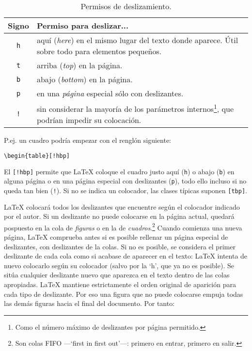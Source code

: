 \begin{table}[!bp]
\caption{Permisos de deslizamiento.}\label{tab:permiss}
\begin{minipage}{\textwidth}
\medskip
\begin{center}
\begin{tabular}{@{}cp{8cm}@{}}
Signo&Permiso para deslizar...\\
\hline
\rule{0pt}{1.05em}\texttt{h} & aquí (\emph{here}) en el mismo lugar
del texto donde aparece.  Útil sobre todo para elementos pequeños.\\[0.3ex]
\texttt{t} & arriba (\emph{top}) en la página.\\[0.3ex]
\texttt{b} & abajo (\emph{bottom}) en la página.\\[0.3ex]
\texttt{p} & en una \emph{página} especial sólo con deslizantes.\\[0.3ex]
\texttt{!} & sin considerar la mayoría de los parámetros
internos\footnote{Como el número máximo de deslizantes por página
  permitido.}, que podrían impedir su colocación.
\end{tabular}
\end{center}
\end{minipage}
\end{table}

P.ej.{} un cuadro podría empezar con el renglón siguiente:
\begin{code}
\verb|\begin{table}[!hbp]|
\end{code}
El  \verb|[!hbp]| permite que \LaTeX{} coloque el cuadro justo aquí (\texttt{h}) o abajo (\texttt{b}) en alguna página o en una página especial con deslizantes (\texttt{p}), todo ello incluso si no queda tan bien (\texttt{!}). Si no se indica un colocador, las clases típicas suponen \verb|[tbp]|.

\LaTeX{} colocará todos los deslizantes que encuentre según el colocador indicado por el autor.  Si un deslizante no puede colocarse en la página actual, quedará pospuesto en la cola de \emph{figuras} o en la de \emph{cuadros}.\footnote{Son colas FIFO ---`first in first out'---: primero en entrar, primero en salir.} Cuando comienza una nueva página, \LaTeX{} comprueba antes si es posible rellenar un página especial de deslizantes, con deslizantes de la colas.  Si no es posible, se considera el primer deslizante de cada cola como si acabase de aparecer en el texto: \LaTeX{} intenta de nuevo colocarlo según su colocador (salvo por la `h', que ya no es posible).  Se sitúa cualquier deslizante nuevo que aparezca en el texto dentro de las colas apropiadas.  \LaTeX{} mantiene estrictamente el orden original de aparición para cada tipo de deslizante.  Por eso una figura que no puede colocarse empuja todas las demás figuras hacia el final del documento.  Por tanto:

